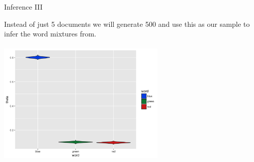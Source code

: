 \documentclass[
  ignorenonframetext,
]{beamer}
\begin{document}
\begin{frame}{Inference III}
\protect\hypertarget{inference-iii}{}

Instead of just 5 documents we will generate 500 and use this as our
sample to infer the word mixtures from.

\begin{center}\includegraphics[width=8cm,height=6cm]{figures/unigramInference500} \end{center}

\end{frame}
\end{document}
